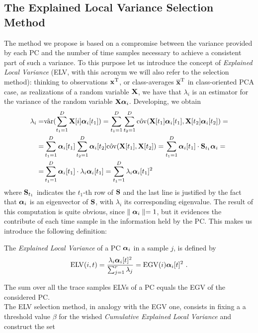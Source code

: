 \subsection{The Explained Local Variance Selection Method} 
The method we propose is based on a compromise between the variance provided by each PC and the number of time samples necessary to achieve a consistent part of such a variance. To this purpose let us introduce the concept of {\em Explained Local Variance} (ELV, with this acronym we will also refer to the selection method): thinking to observations ${\sss[]{}}^\mathrm{T}$, or class-averages ${\mmmX}^\mathrm{T}$ in class-oriented PCA case, as realizations of a random variable $\XXX$, we have that $\lambda_i$ is an estimator for the variance of the random variable $\XXX\AAlpha_i$. Developing, we obtain
\begin{align}\label{eq:ELV}
\lambda_i =& \hat{\mathrm{var}}(\sum_{t_1=1}^D \XXX[i]\AAlpha_i[t_1]) = \sum_{t_1=1}^D\sum_{t_2=1}^D \hat{\mathrm{cov}}(\XXX[t_1]\AAlpha_i[t_1], \XXX[t_2]\AAlpha_i[t_2])=\\
=& \sum_{t_1=1}^D \AAlpha_i[t_1]\sum_{t_2=1}^D\AAlpha_i[t_2]\hat{\mathrm{cov}}(\XXX[t_1], \XXX[t_2])= \sum_{t_1=1}^D \AAlpha_i[t_1]\cdot \covmat_{t_1} \AAlpha_i=  \\
=& \sum_{t_1=1}^D \AAlpha_i[t_1]\cdot \lambda_i\AAlpha_i[t_1]= \sum_{t_1=1}^D  \lambda_i \AAlpha_i[t_1]^2
\end{align}
where $\covmat_{t_1}$ indicates the $t_1$-th row of $\covmat$ and the last line is justified by the fact that $\AAlpha_i$ is an eigenvector of $\covmat$, with $\lambda_i$ its corresponding eigenvalue. The result of this computation is quite obvious, since $\parallel \AAlpha_i\parallel=1$, but it evidences the contribute of each time sample in the information held by the PC. This makes us introduce the following definition:
\begin{definition}
The {\em Explained Local Variance} of a PC $\AAlpha_i$ in a sample $j$, is defined by
\begin{equation}
\mathrm{ELV}(i,t) = \frac{\lambda_i \AAlpha_i[t]^2}{\sum_{j=1}^r\lambda_j} = \mathrm{EGV}(i) \AAlpha_i[t]^2  \mbox{ .}
\end{equation}
\end{definition}
The sum over all the trace samples ELVs of a PC equals the EGV of the considered PC.\\
The ELV selection method, in analogy with the EGV one, consists in fixing a a threshold value $\beta$ for the wished {\em Cumulative Explained Local Variance} and construct the set 
